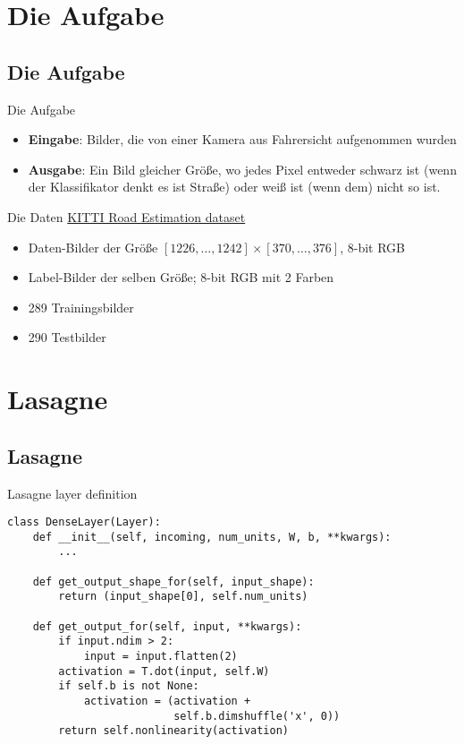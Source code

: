 \section{Die Aufgabe}

\subsection{Die Aufgabe}

\begin{frame}{Die Aufgabe}
    \begin{itemize}
        \item \textbf{Eingabe}: Bilder, die von einer Kamera aus Fahrersicht
              aufgenommen wurden
        \item \textbf{Ausgabe}: Ein Bild gleicher Größe, wo jedes Pixel
              entweder schwarz ist (wenn der Klassifikator denkt es ist Straße)
              oder weiß ist (wenn dem) nicht so ist.
    \end{itemize}
\end{frame}

\begin{frame}{Die Daten}
    \href{http://www.cvlibs.net/datasets/kitti/eval_road.php}{KITTI Road Estimation dataset}
    \begin{itemize}
        \item Daten-Bilder der Größe $[1226, \dots, 1242] \times [370, \dots, 376]$,
              8-bit RGB
        \item Label-Bilder der selben Größe; 8-bit RGB mit 2 Farben
        \item 289 Trainingsbilder
        \item 290 Testbilder
    \end{itemize}
\end{frame}

\section{Lasagne}

\subsection{Lasagne}
\begin{frame}[fragile]{Lasagne layer definition}
\begin{verbatim}
class DenseLayer(Layer):
    def __init__(self, incoming, num_units, W, b, **kwargs):
        ...

    def get_output_shape_for(self, input_shape):
        return (input_shape[0], self.num_units)

    def get_output_for(self, input, **kwargs):
        if input.ndim > 2:
            input = input.flatten(2)
        activation = T.dot(input, self.W)
        if self.b is not None:
            activation = (activation +
                          self.b.dimshuffle('x', 0))
        return self.nonlinearity(activation)
\end{verbatim}


\end{frame}

